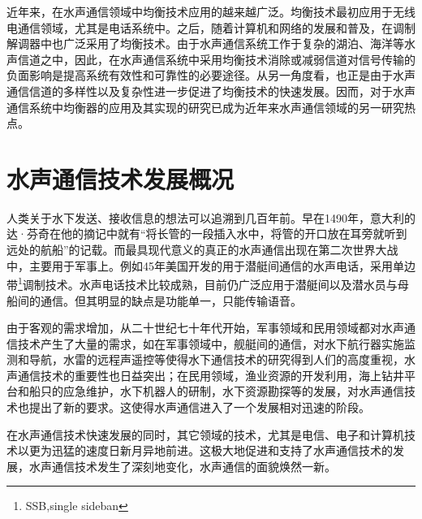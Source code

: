  近年来，在水声通信领域中均衡技术应用的越来越广泛。均衡技术最初应用于无线电通信领域，尤其是电话系统中。之后，随着计算机和网络的发展和普及，在调制解调器中也广泛采用了均衡技术。由于水声通信系统工作于复杂的湖泊、海洋等水声信道之中，因此，在水声通信系统中采用均衡技术消除或减弱信道对信号传输的负面影响是提高系统有效性和可靠性的必要途径。从另一角度看，也正是由于水声通信信道的多样性以及复杂性进一步促进了均衡技术的快速发展。因而，对于水声通信系统中均衡器的应用及其实现的研究已成为近年来水声通信领域的另一研究热点。 
\section{水声通信技术发展概况}
人类关于水下发送、接收信息的想法可以追溯到几百年前。早在1490年，意大利的达·芬奇在他的摘记中就有“将长管的一段插入水中，将管的开口放在耳旁就听到远处的航船”的记载。而最具现代意义的真正的水声通信出现在第二次世界大战中，主要用于军事上。例如45年美国开发的用于潜艇间通信的水声电话，采用单边带\footnote{SSB,single sideban
}调制技术。水声电话技术比较成熟，目前仍广泛应用于潜艇间以及潜水员与母船间的通信。但其明显的缺点是功能单一，只能传输语音。

由于客观的需求增加，从二十世纪七十年代开始，军事领域和民用领域都对水声通信技术产生了大量的需求，如在军事领域中，舰艇间的通信，对水下航行器实施监测和导航，水雷的远程声遥控等使得水下通信技术的研究得到人们的高度重视，水声通信技术的重要性也日益突出；在民用领域，渔业资源的开发利用，海上钻井平台和船只的应急维护，水下机器人的研制，水下资源勘探等的发展，对水声通信技术也提出了新的要求。这使得水声通信进入了一个发展相对迅速的阶段。

在水声通信技术快速发展的同时，其它领域的技术，尤其是电信、电子和计算机技术以更为迅猛的速度日新月异地前进。这极大地促进和支持了水声通信技术的发展，水声通信技术发生了深刻地变化，水声通信的面貌焕然一新。

